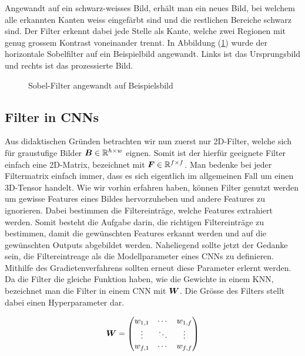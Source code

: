 Angewandt auf ein schwarz-weisses Bild, erhält man ein neues Bild, bei welchem alle erkannten
Kanten weiss eingefärbt sind und die restlichen Bereiche schwarz sind.
Der Filter erkennt dabei jede Stelle als Kante, welche zwei Regionen mit
genug grossem Kontrast voneinander trennt.
In Abbildung (\ref{fig:sobel_filter}) wurde der horizontale Sobelfilter auf ein
Beispielbild angewandt. Links ist das Ursprungsbild und rechts ist das
prozessierte Bild.


\begin{figure}[h!]

  \caption{Sobel-Filter angewandt auf Beispielsbild}
  \label{fig:sobel_filter}
\end{figure}

\para{}
\cite{wiki:sobel_operator}
\cite{deeplearning.ai:cnn}
\cite{wiki:kernel}


\subsection{Filter in CNNs}
Aus didaktischen Gründen betrachten wir nun zuerst
nur 2D-Filter, welche sich für graustufige Bilder
$\bm{B} \in \mathbb{R}^{h \times w}$ eignen. Somit ist der hierfür geeignete
Filter einfach eine 2D-Matrix, bezeichnet mit $\bm{F} \in \mathbb{R}^{f \times
  f}$. Man bedenke bei jeder Filtermatrix einfach immer, dass es sich
eigentlich im allgemeinen Fall um einen 3D-Tensor handelt.
\para{}
Wie wir vorhin erfahren haben, können Filter genutzt werden um gewisse
Features eines Bildes hervorzuheben und andere Features zu ignorieren. Dabei
bestimmen die Filtereinträge, welche Features extrahiert werden. Somit besteht
die Aufgabe darin, die richtigen Filtereinträge zu bestimmen, damit die
gewünschten Features erkannt werden und auf die gewünschten Outputs abgebildet
werden. Naheliegend sollte jetzt der Gedanke sein, die Filtereintreage als die
Modellparameter eines CNNs zu definieren.
Mithilfe des Gradietenverfahrens sollten erneut diese Parameter
erlernt werden. \\
Da die Filter die gleiche Funktion haben, wie die Gewichte in einem KNN,
bezeichnet man die Filter in einem CNN mit $\bm{W}$. Die Grösse des Filters
stellt dabei einen Hyperparameter dar.

\begin{equation*}
  \bm{W} = \begin{pmatrix}
    w_{1,1} & \cdots & w_{1,f} \\
    \vdots & \ddots & \vdots \\
    w_{f,1} & \cdots & w_{f,f}
  \end{pmatrix}
\end{equation*}


